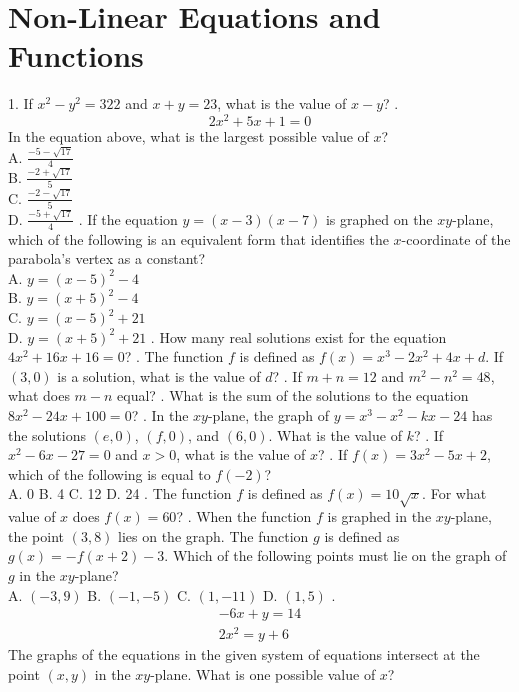 \documentclass[../satmath.tex]{subfiles}
\begin{document}
\chapter{Non-Linear Equations and Functions}
1. If $x^2-y^2=322$ and $x+y=23$, what is the value of $x-y$?
. 
\[2x^2+5x+1=0\]
In the equation above, what is the largest possible value of $x$?\\
A. $\frac{-5-\sqrt{17}}{4}$\\
B. $\frac{-2+\sqrt{17}}{5}$\\
C. $\frac{-2-\sqrt{17}}{5}$\\
D. $\frac{-5+\sqrt{17}}{4}$
. If the equation $y=(x-3)(x-7)$ is graphed on the $xy$-plane, which of the following is an equivalent form that identifies the $x$-coordinate 
of the parabola's vertex as a constant?\\
A. $y=(x-5)^2-4$\\
B. $y=(x+5)^2-4$\\
C. $y=(x-5)^2+21$\\
D. $y=(x+5)^2+21$
. How many real solutions exist for the equation $4x^2+16x+16=0$?
. The function $f$ is defined as $f(x)=x^3-2x^2+4x+d$. If $(3,0)$ is a solution, what is the value of $d$?
. If $m+n = 12$ and $m^2-n^2=48$, what does $m-n$ equal?
. What is the sum of the solutions to the equation $8x^2-24x+100=0$?
. In the $xy$-plane, the graph of $y=x^3-x^2-kx-24$ has the solutions $(e,0)$, $(f,0)$, and $(6,0)$. What is the value of $k$?
. If $x^2-6x-27=0$ and $x>0$, what is the value of $x$?
. If $f(x)=3x^2-5x+2$, which of the following is equal to $f(-2)$?\\
A. 0 \quad B. 4 \quad C. 12 \quad D. 24
. The function $f$ is defined as $f(x)=10\sqrt{x}$. For what value of $x$ does $f(x)=60$?
. When the function $f$ is graphed in the $xy$-plane, the point $(3,8)$ lies on the graph. The function $g$ is defined as $g(x)=-f(x+2)-3$.
Which of the following points must lie on the graph of $g$ in the $xy$-plane?\\
A. $(-3,9)$ \quad B. $(-1,-5)$ \quad C. $(1,-11)$ \quad D. $(1,5)$
. 
\begin{align*}
-6x+y=14\\
2x^2=y+6
\end{align*}
The graphs of the equations in the given system of equations intersect at the point $(x,y)$ in the $xy$-plane. What is one possible value of $x$?\\
\end{document}
